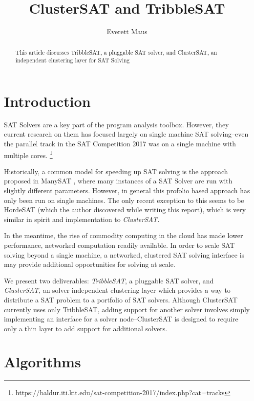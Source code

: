 \documentclass[10pt]{article}
\title{ClusterSAT and TribbleSAT}
\author{Everett Maus}
\begin{document}
\maketitle

\begin{abstract}
   This article discusses TribbleSAT, a pluggable SAT solver, and ClusterSAT, an independent clustering layer for SAT Solving
\end{abstract}

\section{Introduction}
  SAT Solvers are a key part of the program analysis toolbox.  However, they current research on
  them has focused largely on single machine SAT solving--even the parallel track in the SAT 
  Competition 2017 was on a single machine with multiple cores. \footnote{https://baldur.iti.kit.edu/sat-competition-2017/index.php?cat=tracks}

  Historically, a common model for speeding up SAT solving is the approach proposed in ManySAT \cite{Hamadi09manysat:a},
  where many instances of a SAT Solver are run with slightly different parameters.  However, in general this profolio
  based approach has only been run on single machines.  The only recent exception to this seems to be HordeSAT \cite{hordesat} (which the author discovered while writing this report), 
  which is very similar in spirit and implementation to \textit{ClusterSAT}.

  In the meantime, the rise of commodity computing in the cloud has made lower performance, networked
  computation readily available.  In order to scale SAT solving beyond a single machine, a networked, clustered
  SAT solving interface is may provide additional opportunities for solving at scale.

  We present two deliverables:  \textit{TribbleSAT}, a pluggable SAT solver, and \textit{ClusterSAT}, an solver-independent clustering layer which provides
  a way to distribute a SAT problem to a portfolio of SAT solvers.  Although ClusterSAT currently uses only TribbleSAT, adding support
  for another solver involves simply implementing an interface for a solver node--ClusterSAT is designed to require only a thin layer to add support for additional solvers.

\section{Algorithms}
\end{document}
